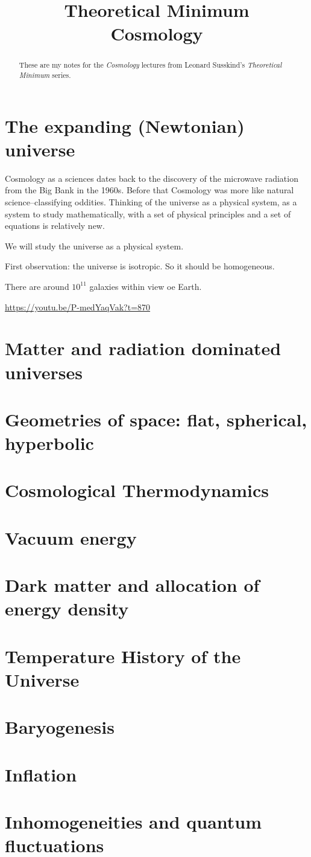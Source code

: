 \documentclass[]{article}
\title{Theoretical Minimum\\Cosmology}
\author{}
\begin{document}
\maketitle

\begin{abstract}
	These are my notes for the \emph{Cosmology}\cite{susskind2013cosmology} lectures from Leonard Susskind's \emph{Theoretical Minimum} series\cite{susskind2007theoretical}. 
\end{abstract}

\tableofcontents
\listoffigures
\listoftables
\listoftheorems

\section{The expanding (Newtonian) universe}

Cosmology as a sciences dates back to the discovery of the microwave radiation from the Big Bank in the 1960s. Before that Cosmology was more like natural science--classifying oddities. Thinking of the universe as a physical system, as a system to study mathematically, with a set of physical principles and a set of equations is relatively new.

We will study the universe as a physical system.

First observation: the universe is isotropic. So it should be homogeneous.

There are around $10^{11}$ galaxies within view oe Earth.
 
\url{https://youtu.be/P-medYaqVak?t=870}

\section{Matter and radiation dominated universes}
\section{Geometries of space: flat, spherical, hyperbolic}
\section{Cosmological Thermodynamics}
\section{Vacuum energy}
\section{Dark matter and allocation of energy density}
\section{Temperature History of the Universe}
\section{Baryogenesis}
\section{Inflation}
\section{Inhomogeneities and quantum fluctuations}



\raggedright

\end{document}
